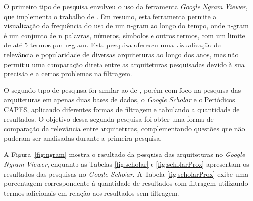 \documentclass[
	12pt,				%
	openright,			%
	oneside,			%
	a4paper,			%
	english,			%
	french,				%
	spanish,			%
	brazil,				%
	]{abntex2}
\begin{document}
O primeiro tipo de pesquisa envolveu o uso da ferramenta \textit{Google Ngram Viewer}, que implementa o trabalho de . Em resumo, esta ferramenta permite a visualização da frequência do uso de um n-gram ao longo do tempo, onde n-gram é um conjunto de n palavras, números, símbolos e outros termos, com um limite de até 5 termos por n-gram. Esta pesquisa ofereceu uma visualização da relevância e popularidade de diversas arquiteturas ao longo dos anos, mas não permitiu uma comparação direta entre as arquiteturas pesquisadas devido à sua precisão e a certos problemas na filtragem\cite{valadares_uma_2025}.

O segundo tipo de pesquisa foi similar ao de , porém com foco na pesquisa das arquiteturas em apenas duas bases de dados, o \textit{Google Scholar} e o Periódicos CAPES, aplicando diferentes formas de filtragem e tabulando a quantidade de resultados. O objetivo dessa segunda pesquisa foi obter uma forma de comparação da relevância entre arquiteturas, complementando questões que não puderam ser analisadas durante a primeira pesquisa.

A Figura~\ref{fig:ngram} mostra o resultado da pesquisa das arquiteturas no \textit{Google Ngram Viewer}, enquanto as Tabelas \ref{fig:scholar} e \ref{fig:scholarProx} apresentam os resultados das pesquisas no \textit{Google Scholar}. A Tabela \ref{fig:scholarProx} exibe uma porcentagem correspondente à quantidade de resultados com filtragem utilizando termos adicionais em relação aos resultados sem filtragem.
\end{document}
